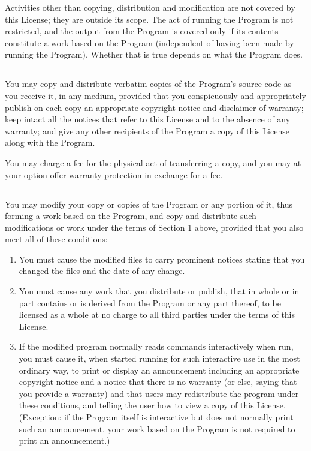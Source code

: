 \documentclass[a4paper, 12pt]{article}
\begin{document}
\vspace{0.3cm}

Activities other than copying, distribution and modification are not covered by this License; they are outside its scope. The act of running the Program is not restricted, and the output from the Program is covered only if its contents constitute a work based on the Program (independent of having been made by running the Program). Whether that is true depends on what the Program does.

\subsection{}

You may copy and distribute verbatim copies of the Program's source code as you receive it, in any medium, provided that you conspicuously and appropriately publish on each copy an appropriate copyright notice and disclaimer of warranty; keep intact all the notices that refer to this License and to the absence of any warranty; and give any other recipients of the Program a copy of this License along with the Program.

\vspace{0.3cm}

You may charge a fee for the physical act of transferring a copy, and you may at your option offer warranty protection in exchange for a fee.

\subsection{}

You may modify your copy or copies of the Program or any portion of it, thus forming a work based on the Program, and copy and distribute such modifications or work under the terms of Section 1 above, provided that you also meet all of these conditions:

\begin{enumerate}[label=\alph*)]
\item You must cause the modified files to carry prominent notices stating that you changed the files and the date of any change.
\item You must cause any work that you distribute or publish, that in whole or in part contains or is derived from the Program or any part thereof, to be licensed as a whole at no charge to all third parties under the terms of this License.
\item If the modified program normally reads commands interactively when run, you must cause it, when started running for such interactive use in the most ordinary way, to print or display an announcement including an appropriate copyright notice and a notice that there is no warranty (or else, saying that you provide a warranty) and that users may redistribute the program under these conditions, and telling the user how to view a copy of this License. (Exception: if the Program itself is interactive but does not normally print such an announcement, your work based on the Program is not required to print an announcement.)
\end{enumerate}
\end{document}
